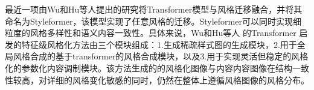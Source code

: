 最近一项由Wu和Hu等人提出的研究\cite{wuStyleFormerRealTimeArbitrary2021}将Transformer模型与风格迁移融合，并将其命名为Styleformer，该模型实现了任意风格的迁移。Styleformer可以同时实现细粒度的风格多样性和语义内容一致性。具体来说，Wu和Hu等人\cite{wuStyleFormerRealTimeArbitrary2021} 的Transformer 启发的特征级风格化方法由三个模块组成：1.生成稀疏样式图的生成模块，2.用于全局风格合成的基于transformer的风格合成模块，以及3.用于实现灵活但稳定的风格化的参数化内容调制模块。该方法生成的的风格化图像与内容内容图像在结构一致性较高，对详细的风格变化敏感的同时，仍然在整体上遵循风格图像的风格分布。